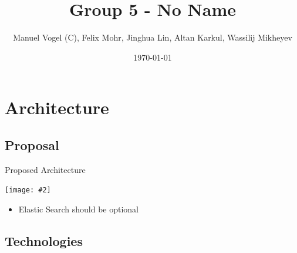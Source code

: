 \documentclass{beamer}
\title{Group 5 - \textbf{No Name}}
\author[]{Manuel Vogel (C), Felix Mohr,  Jinghua Lin,  Altan Karkul, Wassilij Mikheyev}
\institute{Graphical User Interfaces Lab}
\date{\today}
\newcommand{\cgraphic}[2]
{
	\begin{center}
		\texttt{[image: \#2]}
	\end{center}
}%
\begin{document}
\frame{\titlepage}

\section{Architecture}
\subsection{Proposal}
\begin{frame}{Proposed Architecture}
		\cgraphic{.12}{architecture_proposal}
		\begin{itemize}
			\item Elastic Search should be optional
		\end{itemize}
\end{frame}
\subsection{Technologies}
\end{document}

